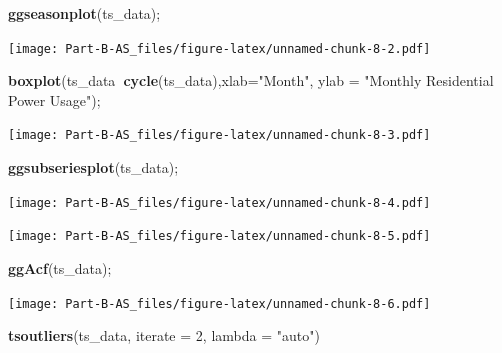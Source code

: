 \documentclass[openany]{book}
\newenvironment{Shaded}{\begin{snugshade}}{\end{snugshade}}
\newcommand{\KeywordTok}[1]{\textcolor[rgb]{0.13,0.29,0.53}{\textbf{#1}}}
\newcommand{\DataTypeTok}[1]{\textcolor[rgb]{0.13,0.29,0.53}{#1}}
\newcommand{\DecValTok}[1]{\textcolor[rgb]{0.00,0.00,0.81}{#1}}
\newcommand{\StringTok}[1]{\textcolor[rgb]{0.31,0.60,0.02}{#1}}
\newcommand{\OperatorTok}[1]{\textcolor[rgb]{0.81,0.36,0.00}{\textbf{#1}}}
\newcommand{\NormalTok}[1]{#1}
\begin{document}
\begin{Shaded}
\begin{Highlighting}[]
\KeywordTok{ggseasonplot}\NormalTok{(ts_data);}
\end{Highlighting}
\end{Shaded}

\texttt{[image: Part-B-AS\_files/figure-latex/unnamed-chunk-8-2.pdf]}

\begin{Shaded}
\begin{Highlighting}[]
\KeywordTok{boxplot}\NormalTok{(ts_data}\OperatorTok{~}\KeywordTok{cycle}\NormalTok{(ts_data),}\DataTypeTok{xlab=}\StringTok{"Month"}\NormalTok{, }\DataTypeTok{ylab =} \StringTok{"Monthly Residential Power Usage"}\NormalTok{);}
\end{Highlighting}
\end{Shaded}

\texttt{[image: Part-B-AS\_files/figure-latex/unnamed-chunk-8-3.pdf]}

\begin{Shaded}
\begin{Highlighting}[]
\KeywordTok{ggsubseriesplot}\NormalTok{(ts_data);}
\end{Highlighting}
\end{Shaded}

\texttt{[image: Part-B-AS\_files/figure-latex/unnamed-chunk-8-4.pdf]}

\begin{Shaded}
\end{Shaded}

\texttt{[image: Part-B-AS\_files/figure-latex/unnamed-chunk-8-5.pdf]}

\begin{Shaded}
\begin{Highlighting}[]
\KeywordTok{ggAcf}\NormalTok{(ts_data);}
\end{Highlighting}
\end{Shaded}

\texttt{[image: Part-B-AS\_files/figure-latex/unnamed-chunk-8-6.pdf]}

\begin{Shaded}
\begin{Highlighting}[]
\KeywordTok{tsoutliers}\NormalTok{(ts_data, }\DataTypeTok{iterate =} \DecValTok{2}\NormalTok{, }\DataTypeTok{lambda =} \StringTok{"auto"}\NormalTok{)}
\end{Highlighting}
\end{Shaded}
\end{document}
